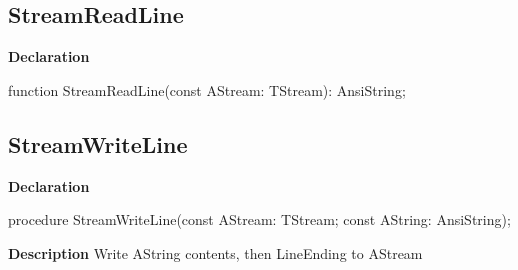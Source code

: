 \documentclass{report}
\newif\ifpdf
\begin{document}
\subsection*{StreamReadLine}
\fi
\label{PasDoc_StreamUtils-StreamReadLine}
\begin{list}{}{
\setlength{\itemindent}{0cm}
\setlength{\listparindent}{0cm}
\setlength{\leftmargin}{\evensidemargin}
\addtolength{\leftmargin}{\tmplength}
\settowidth{\labelsep}{X}
\addtolength{\leftmargin}{\labelsep}
\setlength{\labelwidth}{\tmplength}
}
\item[\textbf{Declaration}\hfill]
\ifpdf
\begin{flushleft}
\fi
\begin{ttfamily}
function StreamReadLine(const AStream: TStream): AnsiString;\end{ttfamily}

\ifpdf
\end{flushleft}
\fi

\end{list}
\ifpdf
\subsection*{\large{\textbf{StreamWriteLine}}\normalsize\hspace{1ex}\hrulefill}
\else
\subsection*{StreamWriteLine}
\fi
\label{PasDoc_StreamUtils-StreamWriteLine}
\begin{list}{}{
\setlength{\itemindent}{0cm}
\setlength{\listparindent}{0cm}
\setlength{\leftmargin}{\evensidemargin}
\addtolength{\leftmargin}{\tmplength}
\settowidth{\labelsep}{X}
\addtolength{\leftmargin}{\labelsep}
\setlength{\labelwidth}{\tmplength}
}
\item[\textbf{Declaration}\hfill]
\ifpdf
\begin{flushleft}
\fi
\begin{ttfamily}
procedure StreamWriteLine(const AStream: TStream; const AString: AnsiString);\end{ttfamily}

\ifpdf
\end{flushleft}
\fi

\par
\item[\textbf{Description}]
Write AString contents, then LineEnding to AStream

\end{list}
\ifpdf
\end{document}
